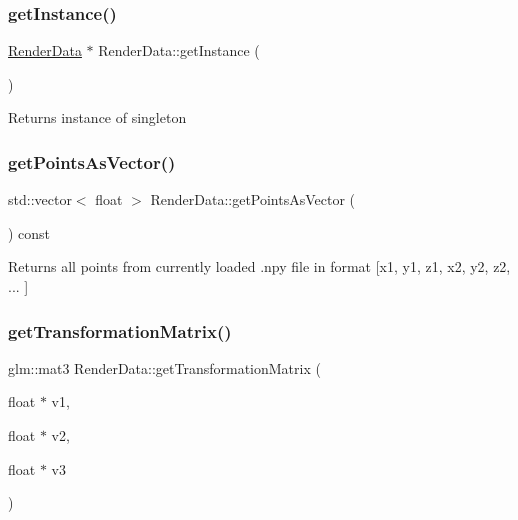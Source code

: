 \subsubsection{\texorpdfstring{get\+Instance()}{getInstance()}}
{\footnotesize\ttfamily \hyperlink{class_render_data}{Render\+Data} $\ast$ Render\+Data\+::get\+Instance (\begin{DoxyParamCaption}{ }\end{DoxyParamCaption})\hspace{0.3cm}{\ttfamily [static]}}

\begin{DoxyReturn}{Returns}
instance of singleton 
\end{DoxyReturn}
\mbox{\label{class_render_data_a24e60dcccd94c47c02e0e47f2ca7b5c2}} 
\subsubsection{\texorpdfstring{get\+Points\+As\+Vector()}{getPointsAsVector()}}
{\footnotesize\ttfamily std\+::vector$<$ float $>$ Render\+Data\+::get\+Points\+As\+Vector (\begin{DoxyParamCaption}{ }\end{DoxyParamCaption}) const}

\begin{DoxyReturn}{Returns}
all points from currently loaded .npy file in format \mbox{[}x1, y1, z1, x2, y2, z2, ... \mbox{]} 
\end{DoxyReturn}
\mbox{\label{class_render_data_afbc604f853739d0198c9da5097987fa7}} 
\subsubsection{\texorpdfstring{get\+Transformation\+Matrix()}{getTransformationMatrix()}}
{\footnotesize\ttfamily glm\+::mat3 Render\+Data\+::get\+Transformation\+Matrix (\begin{DoxyParamCaption}\item[{float $\ast$}]{v1,  }\item[{float $\ast$}]{v2,  }\item[{float $\ast$}]{v3 }\end{DoxyParamCaption})\hspace{0.3cm}{\ttfamily [private]}}

